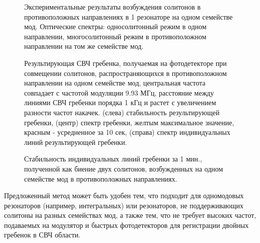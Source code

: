 \begin{figure}[!htb]
\begin{minipage}{1\linewidth}
\end{minipage}
\caption{Экспериментальные результаты возбуждения солитонов в противоположных направлениях в 1 резонаторе на одном семействе мод. Оптические спектры: односолитонный режим в одном направлении, многосолитонный режим в противоположном направлении на том же семействе мод.}
\label{cp_one_family}
\end{figure}

\begin{figure}[!htb]
\begin{minipage}{1\linewidth}
\end{minipage}
\caption{Результирующая СВЧ гребенка, получаемая на фотодетекторе при совмещении солитонов, распространяющихся в противоположном направлении на одном семействе мод, центральная частота совпадает с частотой модуляции 9.93 МГц, расстояние между линиями СВЧ гребенки порядка 1 кГц и растет с увеличением разности частот накачек. (слева) стабильность результирующей гребенки, (центр) спектр гребенки, желтым максимальное значение, красным - усредненное за 10 сек, (справа) спектр индивидуальных линий результирующей гребенки.}
\label{cp_one_family_dual_comb}
\end{figure}

\begin{figure}[!htb]
\begin{minipage}{1\linewidth}
\end{minipage}
\caption{Стабильность индивидуальных линий гребенки за 1 мин., полученной как биение двух солитонов, возбужденных на одном семействе мод в противоположных направлениях.}
\label{cp_one_family_stability}
\end{figure}

Предложенный метод может быть удобен тем, что подходит для одномодовых резонаторов (например, интегральных) или резонаторов, не поддерживающих солитоны на разных семействах мод, а также тем, что не требует высоких частот, подаваемых на модулятор и быстрых фотодетекторов для регистрации двойных гребенок в СВЧ области.

